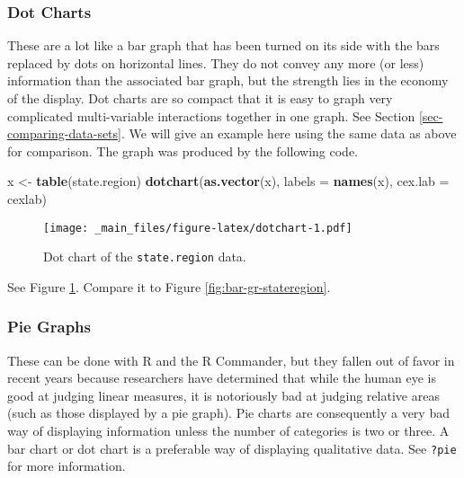 \documentclass[]{book}
\newenvironment{Shaded}{\begin{snugshade}}{\end{snugshade}}
\newcommand{\KeywordTok}[1]{\textcolor[rgb]{0.13,0.29,0.53}{\textbf{{#1}}}}
\newcommand{\DataTypeTok}[1]{\textcolor[rgb]{0.13,0.29,0.53}{{#1}}}
\newcommand{\StringTok}[1]{\textcolor[rgb]{0.31,0.60,0.02}{{#1}}}
\newcommand{\NormalTok}[1]{{#1}}
\numberwithin{equation}{chapter}
\numberwithin{figure}{chapter}
\theoremstyle{plain}
\theoremstyle{definition}
\theoremstyle{remark}
\theoremstyle{definition}
\theoremstyle{definition}
\theoremstyle{remark}
\begin{document}
\subsubsection{Dot Charts}\label{par-dotcharts}

These are a lot like a bar graph that has been turned on its side with
the bars replaced by dots on horizontal lines. They do not convey any
more (or less) information than the associated bar graph, but the
strength lies in the economy of the display. Dot charts are so compact
that it is easy to graph very complicated multi-variable interactions
together in one graph. See Section \ref{sec-comparing-data-sets}. We
will give an example here using the same data as above for comparison.
The graph was produced by the following code.

\begin{Shaded}
\begin{Highlighting}[]
\NormalTok{x <-}\StringTok{ }\KeywordTok{table}\NormalTok{(state.region)}
\KeywordTok{dotchart}\NormalTok{(}\KeywordTok{as.vector}\NormalTok{(x), }\DataTypeTok{labels =} \KeywordTok{names}\NormalTok{(x), }\DataTypeTok{cex.lab =} \NormalTok{cexlab)}
\end{Highlighting}
\end{Shaded}

\begin{figure}[htbp]
\centering
\texttt{[image: \_main\_files/figure-latex/dotchart-1.pdf]}
\caption{\label{fig:dotchart}\small Dot chart of the \texttt{state.region} data.}
\end{figure}



See Figure \ref{fig:dotchart}. Compare it to Figure
\ref{fig:bar-gr-stateregion}.

\subsubsection{Pie Graphs}\label{par-pie-graphs}

These can be done with R and the R Commander, but they fallen out of
favor in recent years because researchers have determined that while the
human eye is good at judging linear measures, it is notoriously bad at
judging relative areas (such as those displayed by a pie graph). Pie
charts are consequently a very bad way of displaying information unless
the number of categories is two or three. A bar chart or dot chart is a
preferable way of displaying qualitative data. See \texttt{?pie}
 for more information.
\end{document}
